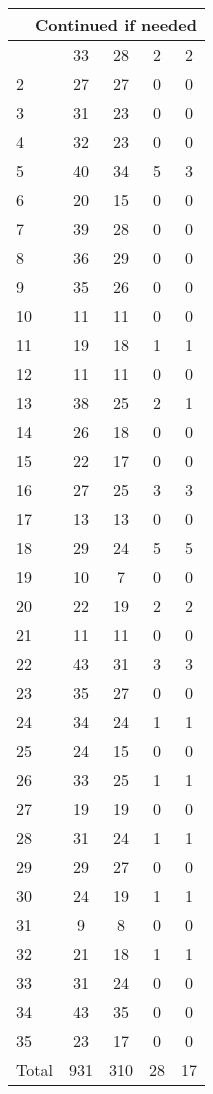 \begin{center}
\begin{longtable}{l|c|c|c|c}
\hline \multicolumn{5}{|r|}{{Continued if needed}} \\ \hline
\endfoot 
1 & 33 & 28 & 2 & 2\\ \hline
2 & 27 & 27 & 0 & 0\\ \hline
3 & 31 & 23 & 0 & 0\\ \hline
4 & 32 & 23 & 0 & 0\\ \hline
5 & 40 & 34 & 5 & 3\\ \hline
6 & 20 & 15 & 0 & 0\\ \hline
7 & 39 & 28 & 0 & 0\\ \hline
8 & 36 & 29 & 0 & 0\\ \hline
9 & 35 & 26 & 0 & 0\\ \hline
10 & 11 & 11 & 0 & 0\\ \hline
11 & 19 & 18 & 1 & 1\\ \hline
12 & 11 & 11 & 0 & 0\\ \hline
13 & 38 & 25 & 2 & 1\\ \hline
14 & 26 & 18 & 0 & 0\\ \hline
15 & 22 & 17 & 0 & 0\\ \hline
16 & 27 & 25 & 3 & 3\\ \hline
17 & 13 & 13 & 0 & 0\\ \hline
18 & 29 & 24 & 5 & 5\\ \hline
19 & 10 & 7 & 0 & 0\\ \hline
20 & 22 & 19 & 2 & 2\\ \hline
21 & 11 & 11 & 0 & 0\\ \hline
22 & 43 & 31 & 3 & 3\\ \hline
23 & 35 & 27 & 0 & 0\\ \hline
24 & 34 & 24 & 1 & 1\\ \hline
25 & 24 & 15 & 0 & 0\\ \hline
26 & 33 & 25 & 1 & 1\\ \hline
27 & 19 & 19 & 0 & 0\\ \hline
28 & 31 & 24 & 1 & 1\\ \hline
29 & 29 & 27 & 0 & 0\\ \hline
30 & 24 & 19 & 1 & 1\\ \hline
31 & 9 & 8 & 0 & 0\\ \hline
32 & 21 & 18 & 1 & 1\\ \hline
33 & 31 & 24 & 0 & 0\\ \hline
34 & 43 & 35 & 0 & 0\\ \hline
35 & 23 & 17 & 0 & 0\\ \hline
\hline \hline
Total & 931 & 310 & 28 & 17



\end{longtable}
\end{center}

